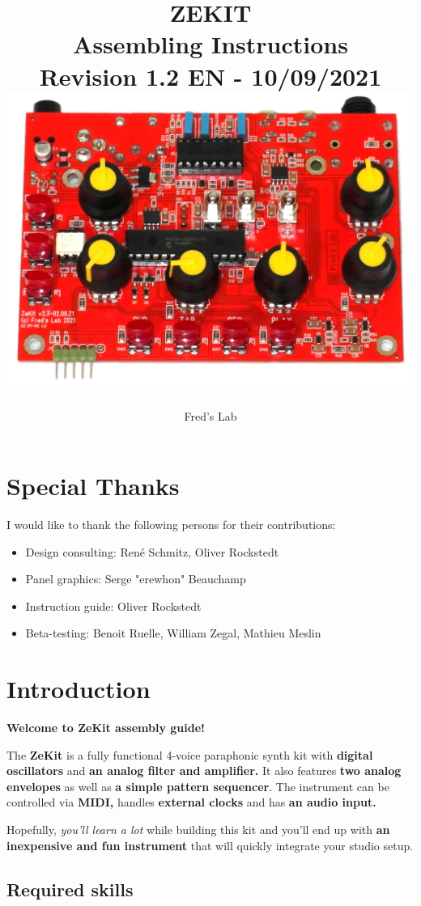 \documentclass{scrartcl}
\title{
    \vspace*{4cm}
    \huge{ZEKIT} \\
    Assembling Instructions \\
    \vspace*{0.25cm}
    \small{Revision 1.2 EN - 10/09/2021} \\
    \vspace*{0.5cm}
    \includegraphics[scale=0.2]{assets/zekit-assembled.jpg}
}
\author{Fred's Lab}
\begin{document}
\maketitle

\pagebreak


\tableofcontents
\pagebreak


\section{Special Thanks}

I would like to thank the following persons for their contributions:

\begin{itemize}
    \item Design consulting: René Schmitz, Oliver Rockstedt
    \item Panel graphics: Serge "erewhon" Beauchamp
    \item Instruction guide: Oliver Rockstedt
    \item Beta-testing: Benoit Ruelle, William Zegal, Mathieu Meslin
\end{itemize}


\section{Introduction}

\textbf{Welcome to ZeKit assembly guide!}

The \textbf{ZeKit} is a fully functional 4-voice paraphonic synth kit with \textbf{digital oscillators} and \textbf{an analog filter and amplifier.}
It also features \textbf{two analog envelopes} as well as \textbf{a simple pattern sequencer}.
The instrument can be controlled via \textbf{MIDI,} handles \textbf{external clocks} and has \textbf{an audio input.}

Hopefully, \emph{you'll learn a lot} while building this kit and you'll end up with \textbf{an inexpensive and fun instrument} that will quickly integrate your studio setup.

\subsection{Required skills}
\end{document}
